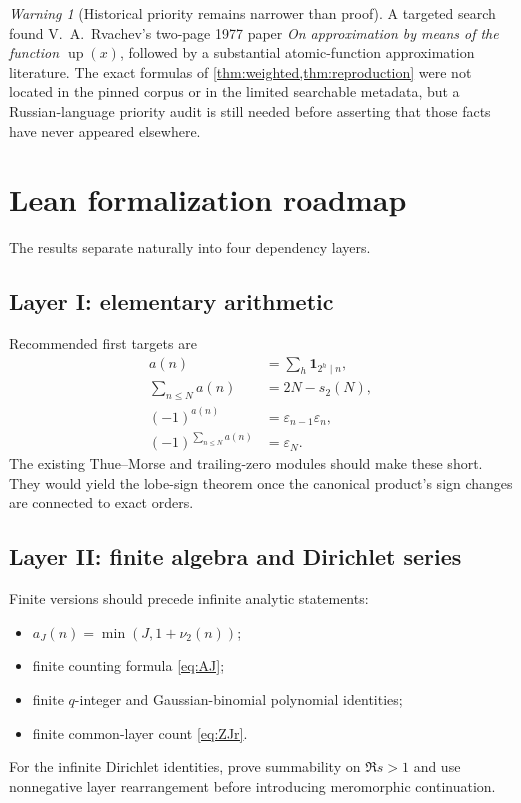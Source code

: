 \documentclass[11pt,oneside]{article}
\numberwithin{equation}{section}
\theoremstyle{definition}
\theoremstyle{remark}
\newtheorem{warning}[theorem]{Warning}
\newcommand{\Up}{\operatorname{up}}
\begin{document}
\begin{warning}[Historical priority remains narrower than proof]
A targeted search found V.~A.~Rvachev's two-page 1977 paper \emph{On approximation
by means of the function $\Up(x)$}, followed by a substantial atomic-function
approximation literature.  The exact formulas of \cref{thm:weighted,thm:reproduction}
were not located in the pinned corpus or in the limited searchable metadata, but
a Russian-language priority audit is still needed before asserting that those
facts have never appeared elsewhere.
\end{warning}

\section{Lean formalization roadmap}
\label{sec:lean}

The results separate naturally into four dependency layers.

\subsection{Layer I: elementary arithmetic}

Recommended first targets are
\begin{align*}
 a(n)&=\sum_h\mathbf1_{2^h\mid n},\\
 \sum_{n\le N}a(n)&=2N-s_2(N),\\
 (-1)^{a(n)}&=\varepsilon_{n-1}\varepsilon_n,\\
 (-1)^{\sum_{n\le N}a(n)}&=\varepsilon_N.
\end{align*}
The existing Thue--Morse and trailing-zero modules should make these short.
They would yield the lobe-sign theorem once the canonical product's sign changes
are connected to exact orders.

\subsection{Layer II: finite algebra and Dirichlet series}

Finite versions should precede infinite analytic statements:
\begin{itemize}
\item $a_J(n)=\min(J,1+\nu_2(n))$;
\item finite counting formula \eqref{eq:AJ};
\item finite $q$-integer and Gaussian-binomial polynomial identities;
\item finite common-layer count \eqref{eq:ZJr}.
\end{itemize}
For the infinite Dirichlet identities, prove summability on $\Re s>1$ and use
nonnegative layer rearrangement before introducing meromorphic continuation.
\end{document}
